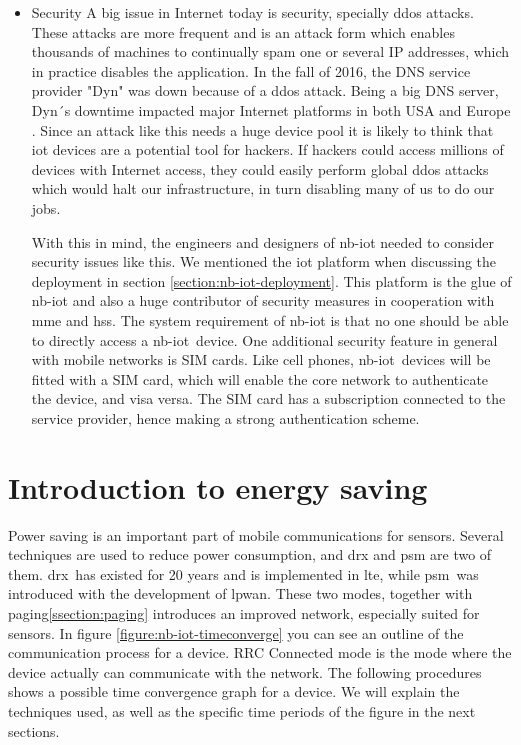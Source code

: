 \documentclass[USenglish]{ifimaster}  %
\begin{document}
\begin{itemize}
  \item Security \newline
  A big issue in Internet today is security, specially \acrshort{ddos} attacks. These attacks are more frequent and is an attack form which enables thousands of machines to continually spam one or several IP addresses, which in practice disables the application. In the fall of 2016, the DNS service provider "Dyn" was down because of a \acrshort{ddos} attack. Being a big DNS server, Dyn´s downtime impacted major Internet platforms in both USA and Europe \cite{online:ddosAttack}. Since an attack like this needs a huge device pool it is likely to think that \acrshort{iot} devices are a potential tool for hackers. If hackers could access millions of devices with Internet access, they could easily perform global \acrshort{ddos} attacks which would halt our infrastructure, in turn disabling many of us to do our jobs.


  With this in mind, the engineers and designers of \acrshort{nb-iot} needed to consider security issues like this. We mentioned the \acrshort{iot} platform when discussing the deployment in section \ref{section:nb-iot-deployment}. This platform is the glue of \acrshort{nb-iot} and also a huge contributor of security measures in cooperation with \acrshort{mme} and \acrshort{hss}. The system requirement of \acrshort{nb-iot} is that no one should be able to directly access a \acrshort{nb-iot} device. One additional security feature in general with mobile networks is SIM cards. Like cell phones, \acrshort{nb-iot} devices will be fitted with a SIM card, which will enable the core network to authenticate the device, and visa versa. The SIM card has a subscription connected to the service provider, hence making a strong authentication scheme.
\end{itemize}

\section{Introduction to energy saving} \label{section:energysaving}
Power saving is an important part of mobile communications for sensors. Several techniques are used to reduce power consumption, and \acrfull{drx} and \acrfull{psm} are two of them. \acrshort{drx} has existed for 20 years and is implemented in \acrshort{lte}, while \acrshort{psm} was introduced with the development of \acrshort{lpwan}. These two modes, together with paging\ref{ssection:paging} introduces an improved network, especially suited for sensors. In figure \vref{figure:nb-iot-timeconverge} you can see an outline of the communication process for a device. RRC Connected mode is the mode where the device actually can communicate with the network. The following procedures shows a possible time convergence graph for a device. We will explain the techniques used, as well as the specific time periods of the figure in the next sections.
\end{document}

